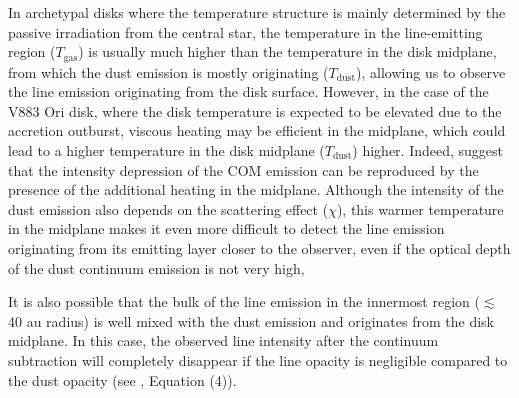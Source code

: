 \documentclass[linenumbers, twocolumn, twocolappendix, astrosymb, times]{aastex631}
\begin{document}
In archetypal disks where the temperature structure is mainly determined by the passive irradiation from the central star, the temperature in the line-emitting region ($T_\mathrm{gas}$) is usually much higher than the temperature in the disk midplane, from which the dust emission is mostly originating ($T_\mathrm{dust}$), allowing us to observe the line emission originating from the disk surface. However, in the case of the V883 Ori disk, where the disk temperature is expected to be elevated due to the accretion outburst, viscous heating may be efficient in the midplane, which could lead to a higher temperature in the disk midplane ($T_\mathrm{dust}$) higher. Indeed, \citet{Lee2019} suggest that the intensity depression of the COM emission can be reproduced by the presence of the additional heating in the midplane. Although the intensity of the dust emission also depends on the scattering effect ($\chi$), this warmer temperature in the midplane makes it even more difficult to detect the line emission originating from its emitting layer closer to the observer, even if the optical depth of the dust continuum emission is not very high, 

It is also possible that the bulk of the line emission in the innermost region ($\lesssim$ 40 au radius) is well mixed with the dust emission and originates from the disk midplane. In this case, the observed line intensity after the continuum subtraction will completely disappear if the line opacity is negligible compared to the dust opacity (see \citealt{Bosman2021}, Equation (4)). 


\end{document}
